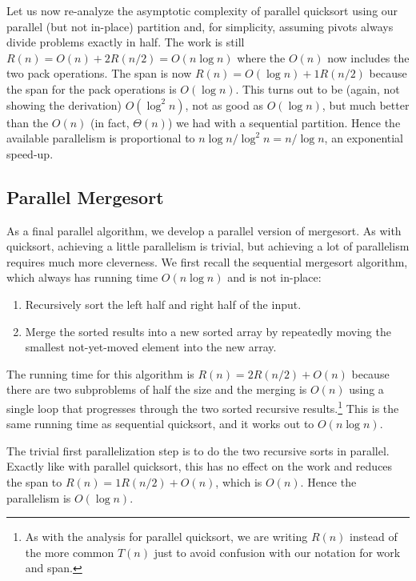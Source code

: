 \documentclass[10pt]{article}
\begin{document}
Let us now re-analyze the asymptotic complexity of parallel quicksort
using our parallel (but not in-place) partition and, for simplicity,
assuming pivots always divide problems exactly in half.  The work
is still $R(n)=O(n)+2R(n/2)=O(n\log n)$ where the $O(n)$ now includes
the two pack operations.  The span is now $R(n)=O(\log
n)+1R(n/2)$ because the span for the pack operations is $O(\log n)$.
This turns out to be (again, not showing the derivation) $O(\log^2 n)$, not as good as
$O(\log n)$, but much better than the $O(n)$ (in fact, $\Theta(n)$) we
had with a sequential partition.  Hence the available parallelism is
proportional to $n\log n/\log^2 n=n/\log n$, an exponential speed-up.

\subsection{Parallel Mergesort}

As a final parallel algorithm, we develop a parallel version of
mergesort.  As with quicksort, achieving a little parallelism is
trivial, but achieving a lot of parallelism requires much more
cleverness. We first recall the sequential mergesort algorithm, which
always has running time $O(n\log n)$ and is not in-place:
\begin{enumerate}
\item Recursively sort the left half and right half of the input.
\item Merge the sorted results into a new sorted array by repeatedly
  moving the smallest not-yet-moved element into the new array.
\end{enumerate}
The running time for this algorithm is $R(n)=2R(n/2)+O(n)$ because there
are two subproblems of half the size and the merging is $O(n)$ using a
single loop that progresses through the two sorted recursive
results.\footnote{As with the analysis for parallel quicksort, we are
  writing $R(n)$ instead of the more common $T(n)$ just to avoid
  confusion with our notation for work and span.}  This is the same
running time as sequential quicksort, and it works out to $O(n\log
n)$.

The trivial first parallelization step is to do the two recursive
sorts in parallel.  Exactly like with parallel quicksort, this has no
effect on the work and reduces the span to $R(n)=1R(n/2)+O(n)$, which
is $O(n)$.  Hence the parallelism is $O(\log n)$.
\end{document}
